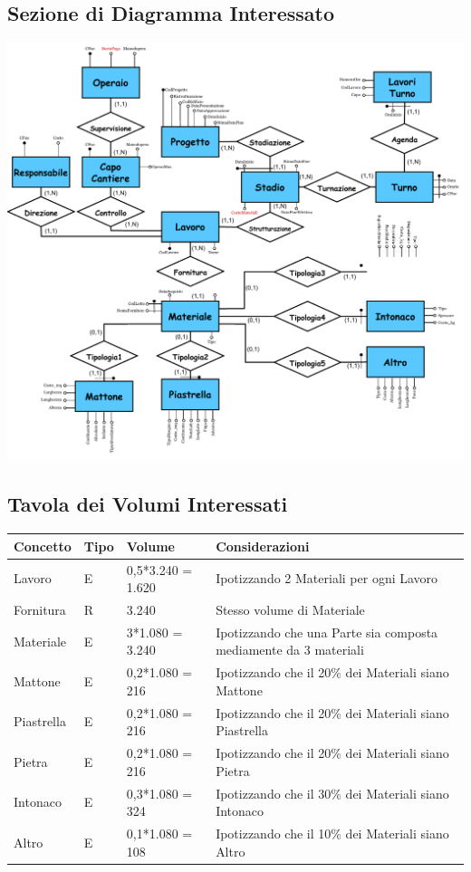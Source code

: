 \documentclass[12pt,a4paper]{report}
\begin{document}
        \subsection{Sezione di Diagramma Interessato}
        \begin{center}
            \includegraphics[scale=0.9]{sezione_operazione8.pdf}
        \end{center}

        \subsection{Tavola dei Volumi Interessati}
        \begin{tabular}{|p{4cm}|p{1cm}|p{3cm}|p{8cm}|}
            \hline
            \textbf{Concetto} & \textbf{Tipo} & \textbf{Volume} & \textbf{Considerazioni} \\ \hline
            Lavoro & E & 0,5*3.240 = 1.620 & Ipotizzando 2 Materiali per ogni Lavoro \\ \hline
            Fornitura & R & 3.240 & Stesso volume di Materiale \\ \hline
            Materiale & E & 3*1.080 = 3.240 & Ipotizzando che una Parte sia composta mediamente da 3 materiali \\ \hline
            Mattone & E & 0,2*1.080 = 216 & Ipotizzando che il 20\% dei Materiali siano Mattone \\ \hline
            Piastrella & E & 0,2*1.080 = 216 & Ipotizzando che il 20\% dei Materiali siano Piastrella \\ \hline
            Pietra & E & 0,2*1.080 = 216 & Ipotizzando che il 20\% dei Materiali siano Pietra \\ \hline
            Intonaco & E & 0,3*1.080 =  324 & Ipotizzando che il 30\% dei Materiali siano Intonaco \\ \hline
            Altro & E & 0,1*1.080 = 108 & Ipotizzando che il 10\% dei Materiali siano Altro \\ \hline
        \end{tabular}
    
\end{document}
